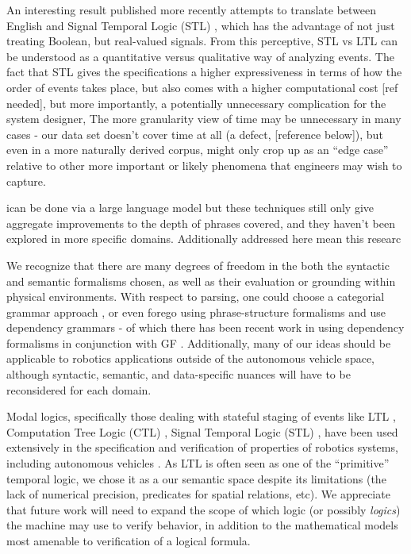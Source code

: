 \documentclass[a4paper, 11pt]{article}
\begin{document}

An interesting result published more recently attempts to translate between
English and Signal Temporal Logic (STL) \cite{he2021english}, which has the
advantage of not just treating Boolean, but real-valued signals. From this
perceptive, STL vs LTL can be understood as a quantitative versus qualitative
way of analyzing events. The fact that STL gives the specifications a higher
expressiveness in terms of how the order of events takes place, but also comes
with a higher computational cost [ref needed], but more importantly, a
potentially unnecessary complication for the system designer, The more
granularity view of time may be unnecessary in many cases - our data set doesn't
cover time at all (a defect, [reference below]), but even in a more naturally
derived corpus, might only crop up as an ``edge case'' relative to other more
important or likely phenomena that engineers may wish to capture.



ican be done via a large language model 
 but these techniques still only give
aggregate improvements to the depth of phrases covered, and they haven't been
explored in more specific domains. Additionally
addressed here mean this researc

We recognize that there are many degrees of freedom in the both the syntactic
and semantic formalisms chosen, as well as their evaluation or grounding within
physical environments. With respect to parsing, one could choose a categorial
grammar approach \cite{5152776}, or even forego using phrase-structure
formalisms and use dependency grammars - of which there has been recent work in
using dependency formalisms in conjunction with GF \cite{ranta2017cross}.
Additionally, many of our ideas should be applicable to robotics applications
outside of the autonomous vehicle space, although syntactic, semantic, and
data-specific nuances will have to be reconsidered for each domain.



Modal logics, specifically those dealing with stateful staging of events like
LTL \cite{ltl95}, Computation Tree Logic (CTL) \cite{yooCTL}, Signal Temporal
Logic (STL) \cite{stlAut} , have been used extensively in the specification and
verification of properties of robotics systems, including autonomous vehicles .
As LTL is often seen as one of the ``primitive'' temporal logic, we chose it as
a our semantic space despite its limitations (the lack of numerical precision,
predicates for spatial relations, etc). We appreciate that future work will need
to expand the scope of which logic (or possibly \emph{logics}) the machine may
use to verify behavior, in addition to the mathematical models most amenable to
verification of a logical formula.
\end{document}
